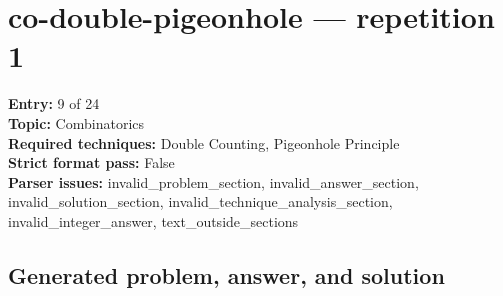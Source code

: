 \documentclass[11pt]{article}
\begin{document}
\section{co-double-pigeonhole --- repetition 1}
{\color{metadata}
\textbf{Entry:} 9 of 24\\
\textbf{Topic:} Combinatorics\\
\textbf{Required techniques:} Double Counting, Pigeonhole Principle\\
\textbf{Strict format pass:} False\\
\textbf{Parser issues:} invalid\_problem\_section, invalid\_answer\_section, invalid\_solution\_section, invalid\_technique\_analysis\_section, invalid\_integer\_answer, text\_outside\_sections
}

\subsection*{Generated problem, answer, and solution}
\end{document}
